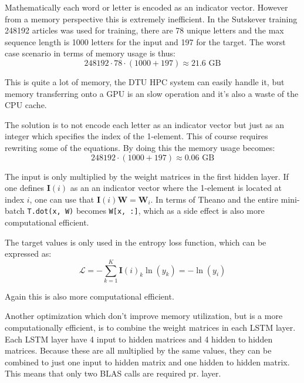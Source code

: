 Mathematically each word or letter is encoded as an indicator vector. However from a memory perspective this is extremely inefficient. In the Sutskever training 248192 articles was used for training, there are 78 unique letters and the max sequence length is 1000 letters for the input and 197 for the target. The worst case scenario in terms of memory usage is thus:
\begin{equation}
248192 \cdot 78 \cdot (1000 + 197) \approx 21.6 \text{ GB}
\end{equation}

This is quite a lot of memory, the DTU HPC system can easily handle it, but memory transferring onto a GPU is an slow operation and it's also a waste of the CPU cache.

The solution is to not encode each letter as an indicator vector but just as an integer which specifies the index of the 1-element. This of course requires rewriting some of the equations. By doing this the memory usage becomes:
\begin{equation}
248192 \cdot (1000 + 197) \approx 0.06 \text{ GB}
\end{equation}

The input is only multiplied by the weight matrices in the first hidden layer. If one defines $\mathbf{I}(i)$ as an an indicator vector where the 1-element is located at index $i$, one can use that $\mathbf{I}(i) \mathbf{W} = \mathbf{W}_{i}$. In terms of Theano and the entire mini-batch \texttt{T.dot(x, W)} becomes \texttt{W[x, :]}, which as a side effect is also more computational efficient.

The target values is only used in the entropy loss function, which can be expressed as:
\begin{equation}
\mathcal{L} = - \sum_{k=1}^K \mathbf{I}(i)_k \ln(y_k) = - \ln(y_i)
\end{equation}

Again this is also more computational efficient.

Another optimization which don't improve memory utilization, but is a more computationally efficient, is to combine the weight matrices in each LSTM layer. Each LSTM layer have 4 input to hidden matrices and 4 hidden to hidden matrices. Because these are all multiplied by the same values, they can be combined to just one input to hidden matrix and one hidden to hidden matrix. This means that only two BLAS calls are required pr. layer.
